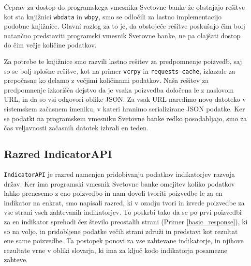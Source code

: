 Čeprav za dostop do programskega vmesnika Svetovne banke že obstajajo 
rešitve kot sta knjižnici 
\verb|wbdata| in
\verb|wbpy|, smo se odločili
za lastno implementacijo podobne knjižnice. Glavni razlog za to je, da
obstoječe rešitve poskušajo čim bolj natančno predstaviti programski
vmesnik Svetovne banke, ne pa olajšati dostop do čim večje količine
podatkov.

Za potrebe te knjižnice smo razvili lastno rešitev za predpomnenje poizvedb,
saj so se bolj splošne rešitve, kot na primer
\verb|vcrpy| in
\verb|requests-cache|, 
izkazale za prepočasne ko delamo z večjimi količinami podatkov. Naša
rešitev za predpomnenje izkorišča dejstvo da je vsaka poizvedba določena le
z naslovom URL, in da so vsi odgovori oblike JSON. Za vsak URL naredimo novo
datoteko v sistemskem začasnem imeniku, v kateri hranimo serializirane JSON
podatke. Ker se podatki na programskem vmesniku Svetovne banke redko
posodabljajo, smo za čas veljavnosti začasnih datotek izbrali en teden.






\subsection{Razred IndicatorAPI}

\verb|IndicatorAPI| je razred namenjen pridobivanju podatkov indikatorjev
razvoja držav. Ker ima programski vmesnik Svetovne banke omejitev koliko 
podatkov lahko prenesemo z eno poizvedbo in nam dovoli tvoriti poizvedbe le za
en indikator na enkrat, smo napisali razred, ki v ozadju tvori in izvede
poizvedbe za vse strani vseh zahtevanih indikatorjev. To poskrbi tako da se po
prvi poizvedbi za en indikator sprehodi čez število preostalih strani 
(Primer \ref{basic_response}), ki so na voljo, in pridobljene podatke večih
strani združi in predstavi kot rezultat ene same poizvedbe. Ta postopek ponovi
za vse zahtevane indikatorje, in njihove rezultate vrne v obliki slovarja, ki 
ima za ključ kodo indikatorja posamezne zahteve.

